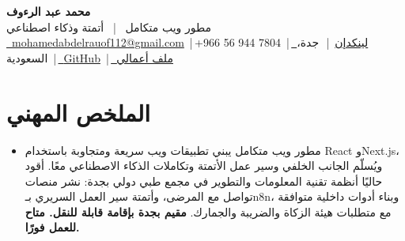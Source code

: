 \documentclass[a4paper,10.5pt]{article}
\begin{document}
\begin{center}
{\huge\bfseries محمد عبد الرءوف} \\[2pt]
{\large مطور ويب متكامل \ | \ أتمتة وذكاء اصطناعي} \\[3pt]
\footnotesize
\href{mailto:mohamedabdelrauof112@gmail.com}{\faEnvelope\ \textenglish{mohamedabdelrauof112@gmail.com}}
\,|\,\textenglish{+966 56 944 7804}
\,|\,\href{https://www.linkedin.com/in/mohamed-abd-el-raouf-6b5b3b235}{\faLinkedin\ لينكدإن}
\,|\,\faMapMarker*\ جدة، السعودية
\,|\,\href{https://github.com/MohamedAbdEl-Rauof}{\faGithub\ \textenglish{GitHub}}
\,|\,\href{https://developer-moraouf.vercel.app}{\faGlobe\ ملف أعمالي}
\end{center}

\vspace{-6pt}

\section{الملخص المهني}
\begin{itemize}[rightmargin=0.1in, leftmargin=0.0in, label={}, itemsep=0pt, parsep=0pt]
\item\small{
مطور ويب متكامل يبني تطبيقات ويب سريعة ومتجاوبة باستخدام \textenglish{React} و\textenglish{Next.js}، ويُسلّم الجانب الخلفي وسير عمل الأتمتة وتكاملات الذكاء الاصطناعي معًا. أقود حاليًا أنظمة تقنية المعلومات والتطوير في مجمع طبي دولي بجدة: نشر منصات تواصل مع المرضى، وأتمتة سير العمل السريري بـ\textenglish{n8n}، وبناء أدوات داخلية متوافقة مع متطلبات هيئة الزكاة والضريبة والجمارك.
\textbf{مقيم بجدة بإقامة قابلة للنقل. متاح للعمل فورًا.}
}
\end{itemize}

\vspace{-4pt}

\end{document}
